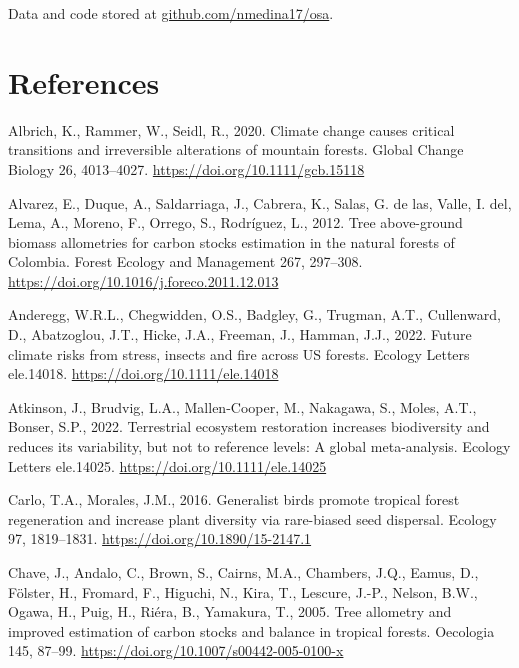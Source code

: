 \documentclass[
  12pt,
]{article}
\newlength{\cslhangindent}
\newlength{\cslentryspacingunit} %
\newenvironment{CSLReferences}[2] %
 {%
  \setlength{\parindent}{0pt}
  \ifodd #1
  \let\oldpar\par
  \def\par{\hangindent=\cslhangindent\oldpar}
  \fi
  \setlength{\parskip}{#2\cslentryspacingunit}
 }%
 {}
\begin{document}
Data and code stored at \href{github.com/nmedin17/osa}{github.com/nmedina17/osa}.

\newpage

\hypertarget{references}{%
\section*{References}\label{references}}

\hypertarget{refs}{}
\begin{CSLReferences}{1}{0}
\leavevmode{}%
Albrich, K., Rammer, W., Seidl, R., 2020. Climate change causes critical transitions and irreversible alterations of mountain forests. Global Change Biology 26, 4013--4027. \url{https://doi.org/10.1111/gcb.15118}

\leavevmode{}%
Alvarez, E., Duque, A., Saldarriaga, J., Cabrera, K., Salas, G. de las, Valle, I. del, Lema, A., Moreno, F., Orrego, S., Rodríguez, L., 2012. Tree above-ground biomass allometries for carbon stocks estimation in the natural forests of {Colombia}. Forest Ecology and Management 267, 297--308. \url{https://doi.org/10.1016/j.foreco.2011.12.013}

\leavevmode{}%
Anderegg, W.R.L., Chegwidden, O.S., Badgley, G., Trugman, A.T., Cullenward, D., Abatzoglou, J.T., Hicke, J.A., Freeman, J., Hamman, J.J., 2022. Future climate risks from stress, insects and fire across {US} forests. Ecology Letters ele.14018. \url{https://doi.org/10.1111/ele.14018}

\leavevmode{}%
Atkinson, J., Brudvig, L.A., Mallen-Cooper, M., Nakagawa, S., Moles, A.T., Bonser, S.P., 2022. Terrestrial ecosystem restoration increases biodiversity and reduces its variability, but not to reference levels: {A} global meta-analysis. Ecology Letters ele.14025. \url{https://doi.org/10.1111/ele.14025}

\leavevmode{}%
Carlo, T.A., Morales, J.M., 2016. Generalist birds promote tropical forest regeneration and increase plant diversity via rare-biased seed dispersal. Ecology 97, 1819--1831. \url{https://doi.org/10.1890/15-2147.1}

\leavevmode{}%
Chave, J., Andalo, C., Brown, S., Cairns, M.A., Chambers, J.Q., Eamus, D., Fölster, H., Fromard, F., Higuchi, N., Kira, T., Lescure, J.-P., Nelson, B.W., Ogawa, H., Puig, H., Riéra, B., Yamakura, T., 2005. Tree allometry and improved estimation of carbon stocks and balance in tropical forests. Oecologia 145, 87--99. \url{https://doi.org/10.1007/s00442-005-0100-x}


\end{CSLReferences}
\end{document}
